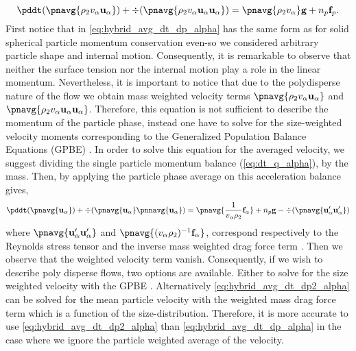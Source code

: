 \begin{equation}
    \pddt (\pnavg{\rho_2 v_\alpha\textbf{u}_\alpha})
    + \div(\pnavg{\rho_2 v_\alpha \textbf{u}_\alpha \textbf{u}_\alpha })
    = \pnavg{\rho_2 v_\alpha}\textbf{g}
    + n_p\textbf{f}_p.
    \label{eq:hybrid_avg_dt_dp_alpha}\\
\end{equation}
First notice that in \ref{eq:hybrid_avg_dt_dp_alpha} has the same form as for solid spherical particle momentum conservation \citep{jackson1997locally} even-so we considered arbitrary particle shape and internal motion. 
Consequently, it is remarkable to observe that neither the surface tension nor the internal motion play a role in the linear momentum. 
Nevertheless, it is important to notice that due to the polydisperse nature of the flow we obtain mass weighted velocity terms $\pnavg{\rho_2 v_\alpha\textbf{u}_\alpha}$ and $\pnavg{\rho_2 v_\alpha\textbf{u}_\alpha\textbf{u}_\alpha}$. 
Therefore, this equation is not sufficient to describe the momentum of the particle phase, instead one have to solve for the size-weighted velocity moments corresponding to the Generalized Population Balance Equations (GPBE)  \citep{fox2023generalized}. 
In order to solve this equation for the averaged velocity, we suggest dividing the single particle momentum balance (\ref{eq:dt_q_alpha}), by the mass. 
Then, by applying the particle phase average on this acceleration balance gives, 
\begin{equation}
    \pddt (\pnavg{\textbf{u}_\alpha})
    + \div(\pnavg{\textbf{u}_\alpha}\pnnavg{ \textbf{u}_\alpha })
    = 
    \pnavg{\frac{1}{v_\alpha\rho_2}\textbf{f}_\alpha}
    + n_p \textbf{g}
    - \div(\pnavg{\textbf{u}'_\alpha \textbf{u}'_\alpha })
    \label{eq:hybrid_avg_dt_dp2_alpha}
\end{equation}
where $\pnavg{\textbf{u}'_\alpha \textbf{u}'_\alpha }$ and $\pnavg{(v_\alpha\rho_2)^{-1} \textbf{f}_\alpha }$, correspond respectively to the Reynolds stress tensor and the inverse mass weighted drag force term \citep{jackson1997locally}. 
Then we observe that the weighted velocity term vanish. 
Consequently, if we wish to describe poly disperse flows, two options are available. 
Either to solve for the size weighted velocity with the GPBE \citet{fox2023generalized,marchisio2013computational}.
Alternatively \ref{eq:hybrid_avg_dt_dp2_alpha} can be solved for the mean particle velocity with the weighted mass drag force term which is a function of the size-distribution.  
Therefore, it is more accurate to use \ref{eq:hybrid_avg_dt_dp2_alpha} than \ref{eq:hybrid_avg_dt_dp_alpha} in the case where we ignore the particle weighted average of the velocity. 
 



